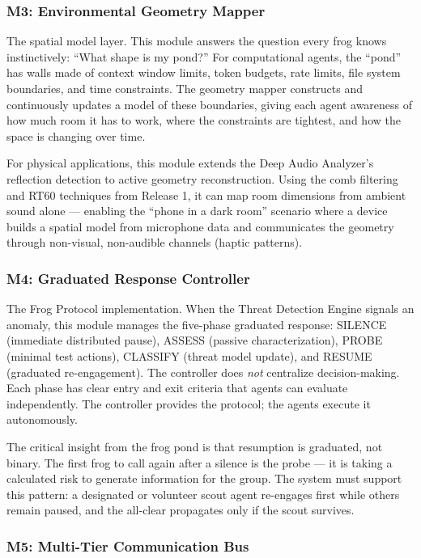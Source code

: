 \documentclass[11pt,letterpaper]{article}
\begin{document}
\subsubsection{M3: Environmental Geometry Mapper}

The spatial model layer. This module answers the question every frog knows instinctively: ``What shape is my pond?'' For computational agents, the ``pond'' has walls made of context window limits, token budgets, rate limits, file system boundaries, and time constraints. The geometry mapper constructs and continuously updates a model of these boundaries, giving each agent awareness of how much room it has to work, where the constraints are tightest, and how the space is changing over time.

For physical applications, this module extends the Deep Audio Analyzer's reflection detection to active geometry reconstruction. Using the comb filtering and RT60 techniques from Release 1, it can map room dimensions from ambient sound alone --- enabling the ``phone in a dark room'' scenario where a device builds a spatial model from microphone data and communicates the geometry through non-visual, non-audible channels (haptic patterns).

\subsubsection{M4: Graduated Response Controller}

The Frog Protocol implementation. When the Threat Detection Engine signals an anomaly, this module manages the five-phase graduated response: SILENCE (immediate distributed pause), ASSESS (passive characterization), PROBE (minimal test actions), CLASSIFY (threat model update), and RESUME (graduated re-engagement). The controller does \textit{not} centralize decision-making. Each phase has clear entry and exit criteria that agents can evaluate independently. The controller provides the protocol; the agents execute it autonomously.

The critical insight from the frog pond is that resumption is graduated, not binary. The first frog to call again after a silence is the probe --- it is taking a calculated risk to generate information for the group. The system must support this pattern: a designated or volunteer scout agent re-engages first while others remain paused, and the all-clear propagates only if the scout survives.

\subsubsection{M5: Multi-Tier Communication Bus}
\end{document}
